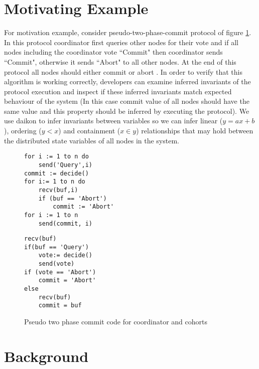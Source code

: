\section{Motivating Example}
For motivation example, consider pseudo-two-phase-commit protocol of figure \ref{lst:2pc}. In this protocol coordinator first queries other nodes for their vote and if all nodes including the coordinator vote ``Commit" then coordinator sends ``Commit", otherwise it sends ``Abort" to all other nodes. At the end of this protocol all nodes should either commit or abort . In order to verify that this algorithm is working correctly, developers can examine inferred invariants of the protocol execution and inspect if these inferred invariants match expected behaviour of the system (In this case commit value of all nodes should have the same value and this property should be inferred by executing the protocol). We use daikon \cite{ernst2001dynamically} to infer invariants between variables so we can infer linear ($y = ax + b$), ordering ($y < x$) and containment ($x \in y$) relationships that may hold between the distributed state variables of all nodes in the system.


\begin{figure}
\centering
\begin{lstlisting}[caption={Coordinator Code}]
for i := 1 to n do
	send('Query',i)
commit := decide()
for i:= 1 to n do
	recv(buf,i)
	if (buf == 'Abort')
		commit := 'Abort'
for i := 1 to n
	send(commit, i)
\end{lstlisting}
\begin{lstlisting}[caption={Coordinator Code}]
recv(buf)
if(buf == 'Query')
	vote:= decide()
	send(vote)
if (vote == 'Abort')
	commit = 'Abort'
else
	recv(buf)
	commit = buf
\end{lstlisting}
\caption{Pseudo two phase commit code for coordinator and cohorts}
\label{lst:2pc}
\end{figure}

\section{Background}


